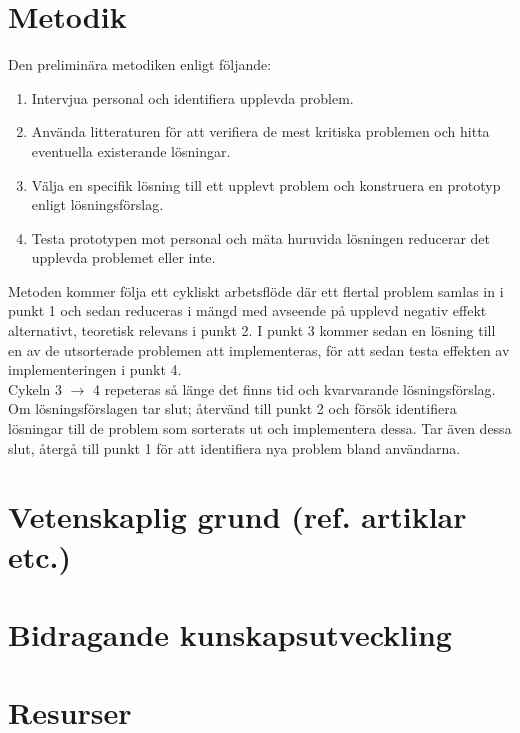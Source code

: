 \documentclass{article}
\begin{document}
\section*{Metodik}

  Den preliminära metodiken enligt följande:
  \begin{enumerate}
    \item{Intervjua personal och identifiera upplevda problem.}
    \item{Använda litteraturen för att verifiera de mest kritiska problemen och
        hitta eventuella existerande lösningar.}
    \item{Välja en specifik lösning till ett upplevt problem och konstruera en
        prototyp enligt lösningsförslag.}
    \item{Testa prototypen mot personal och mäta huruvida lösningen reducerar
        det upplevda problemet eller inte.}
  \end{enumerate}

  Metoden kommer följa ett cykliskt arbetsflöde där ett flertal problem samlas
  in i punkt 1 och sedan reduceras i mängd med avseende på upplevd negativ
  effekt alternativt, teoretisk relevans i punkt 2. I punkt 3 kommer sedan en
  lösning till en av de utsorterade problemen att implementeras, för att sedan
  testa effekten av implementeringen i punkt 4. \\

  Cykeln 3 $\rightarrow$ 4 repeteras så länge det finns tid och kvarvarande
  lösningsförslag. Om lösningsförslagen tar slut; återvänd till punkt 2 och
  försök identifiera lösningar till de problem som sorterats ut och
  implementera dessa. Tar även dessa slut, återgå till punkt 1 för att
  identifiera nya problem bland användarna.


\section*{Vetenskaplig grund (ref. artiklar etc.)}

\section*{Bidragande kunskapsutveckling}

\section*{Resurser}
\end{document}
